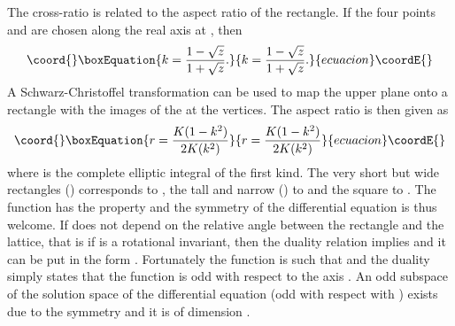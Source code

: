 \documentclass[a4paper,12pt]{article}
\begin{document}
The cross-ratio \coordHE{} is related to the aspect ratio \coordHE{} of the rectangle. If
the four points \coordHE{} and \coordHE{} are chosen along the real axis
at \coordHE{}, then 
\begin{equation*}\coord{}\boxEquation{
k=\frac{1-\sqrt z}{1+\sqrt z}.
}{
k=\frac{1-\sqrt z}{1+\sqrt z}.
}{ecuacion}\coordE{}\end{equation*}
A Schwarz-Christoffel transformation can be used to map the upper plane
onto a rectangle with the images of the \coordHE{} at the vertices. The aspect
ratio is then given as 
\begin{equation*}\coord{}\boxEquation{
r=\frac{K(1-k^2)}{2K(k^2)}
}{
r=\frac{K(1-k^2)}{2K(k^2)}
}{ecuacion}\coordE{}\end{equation*}
where \coordHE{} is the complete elliptic integral of the first kind. The very
short but wide rectangles (\coordHE{}) corresponds to \coordHE{}, the tall and narrow (\coordHE{}) to \coordHE{} and
the square to \coordHE{}. The function \coordHE{} has the property
\coordHE{} and the symmetry \coordHE{} of the differential
equation is thus welcome. If \coordHE{} does not depend on the relative angle
between the rectangle and the lattice, that is if \coordHE{} is a rotational
invariant, then the duality relation implies \coordHE{} and it can
be put in the form \coordHE{}. Fortunately
the function \coordHE{} is such that \coordHE{} and the duality simply
states that the function \coordHE{} is odd with respect to
the axis \coordHE{}. An odd subspace of the solution space of the differential
equation (odd with respect with \coordHE{}) exists due to the symmetry
\coordHE{} and it is of dimension \coordHE{}. 
\end{document}
